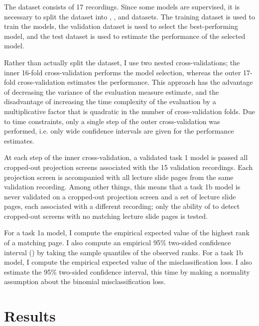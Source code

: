 The dataset consists of 17 recordings.
Since some models are supervised, it is necessary to split the dataset into
, , and  datasets. The training
dataset is used to train the models, the validation dataset is used to select
the best-performing model, and the test dataset is used to estimate the
performance of the selected model.
    
Rather than actually split the dataset, I use two nested cross-validations; the
inner 16-fold cross-validation performs the model selection, whereas the outer
17-fold cross-validation estimates the performance. This approach has the
advantage of decreasing the variance of the evaluation measure estimate,
and the disadvantage of increasing the time complexity of the evaluation by a
multiplicative factor that is quadratic in the number of cross-validation
folds. Due to time constraints, only a single step of the outer
cross-validation was performed, i.e. only wide confidence intervals
are given for the performance estimates.

At each step of the inner cross-validation, a validated task 1 model is passed
all cropped-out projection screens associated with the 15 validation
recordings. Each projection screen is accompanied with all lecture slide pages
from the same validation recording. Among other things, this means that a task
1b model is never validated on a cropped-out projection screen and a set of
lecture slide pages, each associated with a different recording; only the
ability of to detect cropped-out screens with no matching lecture slide pages
is tested.

For a task 1a model, I compute the empirical expected value of the highest rank
of a matching page. I also compute an empirical 95\% two-sided confidence
interval () by taking the sample quantiles of the observed ranks. For
a task 1b model, I compute the empirical expected value of the
misclassification loss. I also estimate the 95\% two-sided confidence interval,
this time by making a normality assumption about the binomial misclassification
loss.

\section{Results}
\label{sec:results}

